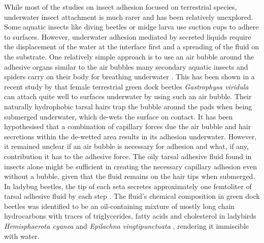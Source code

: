 \documentclass[vruler,JEB]{COB}%
\begin{document}
While most of the studies on insect adhesion focused on terrestrial species, underwater insect attachment is much rarer and has been relatively unexplored. Some aquatic insects like diving beetles \citep{Chen:2014} or midge larva \citep{Kang:2020} use suction cups to adhere to surfaces. However, underwater adhesion mediated by secreted liquids require the displacement of the water at the interface first and a spreading of the fluid on the substrate. One relatively simple approach is to use an air bubble around the adhesive organs similar to the air bubbles many secondary aquatic insects and spiders carry on their body for breathing underwater \citep{Seymour:2013}. This has been shown in a recent study by \citet{RN87} that female terrestrial green dock beetles \emph{Gastrophysa viridula} can attach quite well to surfaces underwater by using such an air bubble. Their naturally hydrophobic tarsal hairs trap the bubble around the pads when being submerged underwater, which de-wets the surface on contact. It has been hypothesised that a combination of capillary forces due the air bubble and hair secretions within the de-wetted area results in its adhesion underwater. However, it remained unclear if an air bubble is necessary for adhesion and what, if any, contribution it has to the adhesive force. The oily tarsal adhesive fluid found in insects alone might be sufficient in creating the necessary capillary adhesion even without a bubble, given that the fluid remains on the hair tips when submerged. In ladybug beetles, the tip of each seta secretes approximately one femtoliter of tarsal adhesive fluid by each step \citep{RN108}. The fluid's chemical composition in green dock beetles was identified to be an oil-containing mixture of mostly long chain hydrocarbons\citep{RN96} with traces
of triglycerides, fatty acids and cholesterol in ladybirds \emph{Hemisphaerota cyanea} \citep{RN221} and \emph{Epilachna vingtipunctuata} \citep{RN222}, rendering it immiscible with water.
\end{document}
